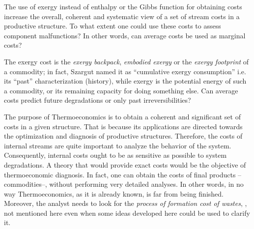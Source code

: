 \documentclass[energies,article,submit,moreauthors,pdftex]{Definitions/mdpi}
\begin{document}
The use of exergy instead of enthalpy or the Gibbs function for obtaining costs increase the overall, coherent and systematic view of a set of stream costs in a productive structure. To what extent one could use these costs to assess component malfunctions? In other words, can average costs be used as marginal costs?

The exergy cost is the \emph{exergy backpack}, \emph{embodied exergy} or the \emph{exergy footprint} of a commodity; in fact, Szargut named it as “cumulative exergy consumption” i.e. its “past” characterization (history), while exergy is the potential energy of such a commodity, or its remaining capacity for doing something else. Can average costs predict future degradations or only past irreversibilities? 

The purpose of Thermoeconomics is to obtain a coherent and significant set of costs in a given structure. That is because its applications are directed towards the optimization and diagnosis of productive structures. Therefore, the costs of internal streams are quite important to analyze the behavior of the system. Consequently, internal costs ought to be as sensitive as possible to system degradations. A theory that would provide exact costs would be the objective of thermoeconomic diagnosis. In fact, one can obtain the costs of final products --commodities--, without performing very detailed analyses. In other words, in no way Thermoeconomics, as it is already known, is far from being finished. Moreover, the analyst needs to look for the \emph{process of formation cost of wastes}, \cite{Torres2008}, not mentioned here even when some ideas developed here could be used to clarify it.
\end{document}
